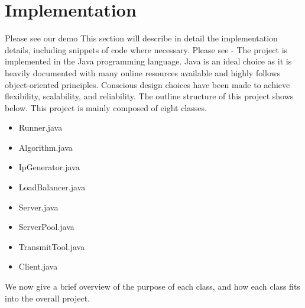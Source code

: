 \documentclass[12pt]{article}
\begin{document}
\section{Implementation}
\label{section: implementation}
Please see our demo\cite{Video}
This section will describe in detail the implementation details, including snippets of code where necessary. Please see \cite{repo} - The project is implemented in the Java programming language. Java is an ideal choice as it is heavily documented with many online resources available and highly follows object-oriented principles. Conscious design choices have been made to achieve flexibility, scalability, and reliability. The outline  structure of this project shows below. This project is mainly composed of eight classes. 
\begin{itemize}
    \item Runner.java
    \item Algorithm.java
    \item IpGenerator.java
    \item LoadBalancer.java
    \item Server.java
    \item ServerPool.java
    \item TransmitTool.java
    \item Client.java
\end{itemize}

We now give a brief overview of the purpose of each class, and how each class fits into the overall project.
\end{document}
